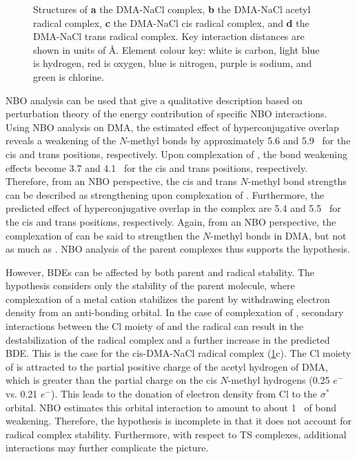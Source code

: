 \begin{doublespace}
\begin{figure}[!htbp]
\caption[Structures of the DMA-NaCl complex and associated radical
complexes.]{Structures of \textbf{a} the DMA-NaCl complex, \textbf{b} the
DMA-NaCl acetyl radical complex, \textbf{c} the DMA-NaCl cis
radical complex, and \textbf{d} the DMA-NaCl trans radical complex. Key
interaction distances are shown in units of \AA. Element colour key: white is
carbon, light blue is hydrogen, red is oxygen, blue is nitrogen, purple is
sodium, and green is chlorine.} \label{fig:dma-na-cl}
\end{figure}

NBO analysis can be used that give a qualitative description based on
perturbation theory of the energy contribution of specific NBO
interactions.\cite{Weinhold2016} Using NBO analysis on DMA, the estimated effect
of hyperconjugative overlap reveals a weakening of the $N$-methyl  bonds
by approximately 5.6 and 5.9 \kcalmol\ for the cis and trans positions,
respectively. Upon complexation of , the bond weakening effects become
3.7 and 4.1 \kcalmol\ for the cis and trans positions, respectively. Therefore,
from an NBO perspective, the cis and trans $N$-methyl bond strengths can be
described as strengthening upon complexation of . Furthermore, the
predicted effect of hyperconjugative overlap in the  complex are
5.4 and 5.5 \kcalmol\ for the cis and trans positions, respectively. Again, from
an NBO perspective, the complexation of  can be said to strengthen the
$N$-methyl  bonds in DMA, but not as much as . NBO analysis of
the parent complexes thus supports the hypothesis.

However, BDEs can be affected by both parent and radical stability. The
hypothesis considers only the stability of the parent molecule, where
complexation of a metal cation stabilizes the parent by withdrawing electron
density from an anti-bonding orbital. In the case of complexation of ,
secondary interactions between the Cl moiety of  and the radical can
result in the destabilization of the radical complex and a further increase in
the predicted  BDE. This is the case for the cis-DMA-NaCl radical
complex (\ref{fig:dma-na-cl}c). The Cl moiety of  is attracted to the
partial positive charge of the acetyl hydrogen of DMA, which is greater than the
partial charge on the cis $N$-methyl hydrogens (0.25 $e^-$ vs. 0.21 $e^-$). This
leads to the donation of electron density from Cl to the  $\sigma^*$
orbital. NBO estimates this orbital interaction to amount to about 1 \kcalmol\
of bond weakening. Therefore, the hypothesis is incomplete in that it does not
account for radical complex stability. Furthermore, with respect to TS
complexes, additional interactions may further complicate the picture.


\end{doublespace}
